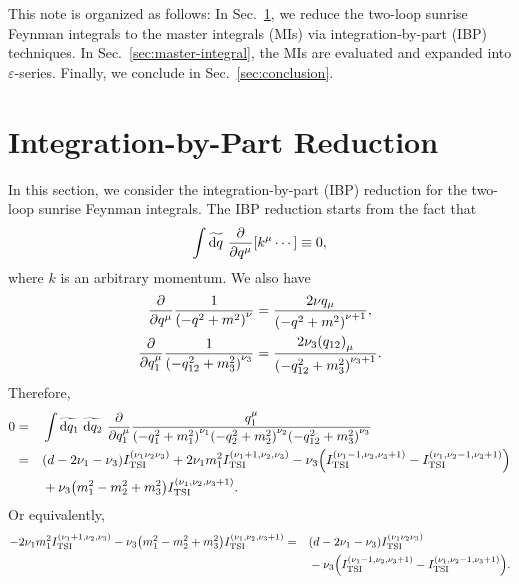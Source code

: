 \documentclass{article}
\begin{document}
        This note is organized as follows:
        In Sec.~\ref{sec:reduction}, we reduce the two-loop sunrise Feynman integrals to the master integrals (MIs) via integration-by-part (IBP) techniques.
        In Sec.~\ref{sec:master-integral}, the MIs are evaluated and expanded into $\varepsilon$-series.
        Finally, we conclude in Sec.~\ref{sec:conclusion}.
    
    \section{Integration-by-Part Reduction}\label{sec:reduction}

        In this section, we consider the integration-by-part (IBP) reduction for the two-loop sunrise Feynman integrals.
        The IBP reduction starts from the fact that \cite[Eq.~(6.2)]{Weinzierl:2022eaz}
        \begin{equation}
            \int \widetilde{\dd{q}} ~ \pdv{q^\mu} \qty[k^\mu \cdots] \equiv 0,
        \end{equation}
        where $k$ is an arbitrary momentum.
        We also have
        \begin{align}
            \pdv{q^\mu} \frac{1}{\denominator{q}[m][\nu]} & = \frac{2 \nu q_\mu}{\denominator{q}[m][\nu + 1]}, \\
            \pdv{q_1^\mu} \frac{1}{\qmThree*} & = \frac{2 \nu_3 \qty(q_{12})_\mu}{\qmThree[\nu_3 + 1]}.
        \end{align}
        Therefore,
        \begin{equation}
            \begin{aligned}
                0 & = & & \int \tildedp{q_1} ~ \tildedp{q_2} ~ \pdv{q_1^\mu} \frac{q_1^\mu}{\qmOne* \qmTwo* \qmThree*} \\
                & = & & \qty(d - 2 \nu_1 - \nu_3) \TSI{\nu_1 \nu_2 \nu_3} + 2 \nu_1 m_1^2 \TSI{\nu_1 + 1, \nu_2, \nu_3} - \nu_3 \qty(\TSI{\nu_1 - 1, \nu_2, \nu_3 + 1} - \TSI{\nu_1, \nu_2 - 1, \nu_3 + 1}) \\
                & & & {} + \nu_3 \qty(m_1^2 - m_2^2 + m_3^2) \TSI{\nu_1, \nu_2, \nu_3 + 1}.
            \end{aligned}
        \end{equation}
        Or equivalently,
        \begin{equation}
            \begin{aligned}
                -2 \nu_1 m_1^2 \TSI{\nu_1 + 1, \nu_2, \nu_3} - \nu_3 \qty(m_1^2 - m_2^2 + m_3^2) \TSI{\nu_1, \nu_2, \nu_3 + 1} & = & & \qty(d - 2 \nu_1 - \nu_3) \TSI{\nu_1 \nu_2 \nu_3} \\
                & & & {} - \nu_3 \qty(\TSI{\nu_1 - 1, \nu_2, \nu_3 + 1} - \TSI{\nu_1, \nu_2 - 1, \nu_3 + 1}). \\
            \end{aligned}
            \label{eq:IBP-1}
        \end{equation}
\end{document}
